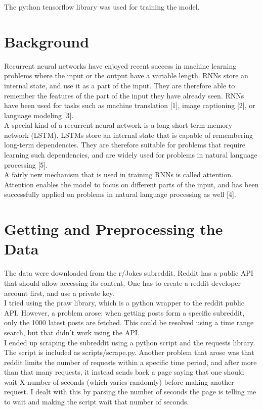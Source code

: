 \documentclass[12pt]{article}
\begin{document}
The python tensorflow library was used for training the model.

\section{Background}

Recurrent neural networks have enjoyed recent success in machine learning problems where the input or the output have a variable length. RNNs store an internal state, and use it as a part of the input. They are therefore able to remember the features of the part of the input they have already seen. RNNs have been used for tasks such as machine translation [1], image captioning [2], or language modeling [3]. \\

A special kind of a recurrent neural network is a long short term memory network (LSTM). LSTMs store an internal state that is capable of remembering long-term dependencies. They are therefore suitable for problems that require learning such dependencies, and are widely used for problems in natural language processing [5]. \\

A fairly new mechanism that is used in training RNNs is called attention. Attention enables the model to focus on different parts of the input, and has been successfully applied on problems in natural language processing as well [4].

\section{Getting and Preprocessing the Data}

The data were downloaded from the r/Jokes subreddit. Reddit has a public API that should allow accessing its content. One has to create a reddit developer account first, and use a private key. \\

I tried using the praw library, which is a python wrapper to the reddit public API. However, a problem arose: when getting posts form a specific subreddit, only the 1000 latest posts are fetched. This could be resolved using a time range search, but that didn't work using the API. \\

I ended up scraping the subreddit using a python script and the requests library. The script is included as scripts/scrape.py. Another problem that arose was that reddit limits the number of requests within a specific time period, and after more than that many requests, it instead sends back a page saying that one should wait X number of seconds (which varies randomly) before making another request. I dealt with this by parsing the number of seconds the page is telling me to wait and making the script wait that number of seconds. \\
\end{document}

